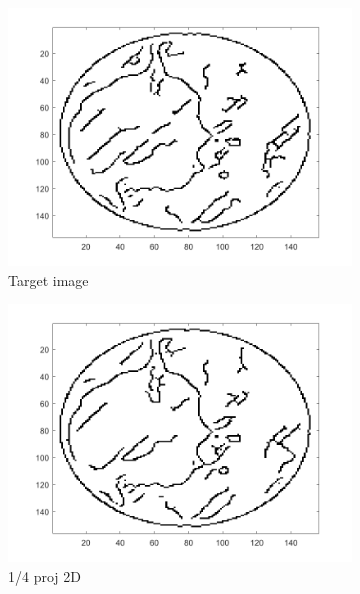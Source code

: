 \begin{figure}[ht!]
      		\begin{subfigure}[b]{0.24\textwidth}
            	\centering
            	\includegraphics[width=\textwidth]{../../data/res/target1_edges.png}
            	\caption{Target image}    
        	\end{subfigure}
        	\begin{subfigure}[b]{0.24\textwidth}  
            	\centering 
            	\includegraphics[width=\textwidth]{../../data/res/SB_Reconstruction/Edges/2D/it250_proj1_4.png}
            	\caption{1/4 proj 2D}    
            	\label{subfig:156p1L-D}
        	\end{subfigure}
        	\begin{subfigure}[b]{0.24\textwidth}  

\end{subfigure}
\end{figure}
